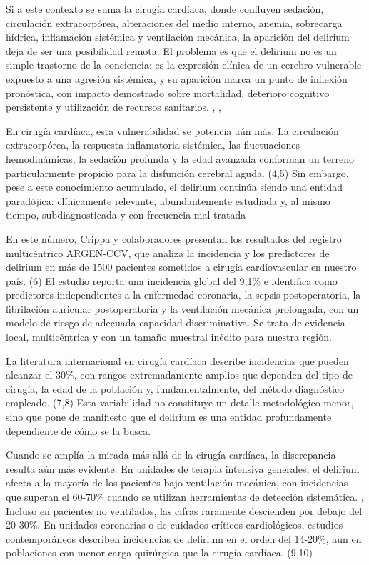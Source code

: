 Si a este contexto se suma la cirugía cardíaca, donde confluyen sedación, circulación extracorpórea, alteraciones del medio interno, anemia, sobrecarga hídrica, inflamación sistémica y ventilación mecánica, la aparición del delirium deja de ser una posibilidad remota. El problema es que el delirium no es un simple trastorno de la conciencia: es la expresión clínica de un cerebro vulnerable expuesto a una agresión sistémica, y su aparición marca un punto de inflexión pronóstica, con impacto demostrado sobre mortalidad, deterioro cognitivo persistente y utilización de recursos sanitarios. \cite{1262-ELY2004}, \cite{1298-INOUYE2014}, \cite{1299-WILSON2020}

En cirugía cardíaca, esta vulnerabilidad se potencia aún más. La circulación extracorpórea, la respuesta inflamatoria sistémica, las fluctuaciones hemodinámicas, la sedación profunda y la edad avanzada conforman un terreno particularmente propicio para la disfunción cerebral aguda. (4,5) Sin embargo, pese a este conocimiento acumulado, el delirium continúa siendo una entidad paradójica: clínicamente relevante, abundantemente estudiada y, al mismo tiempo, subdiagnosticada y con frecuencia mal tratada

En este número, Crippa y colaboradores presentan los resultados del registro multicéntrico ARGEN-CCV, que analiza la incidencia y los predictores de delirium en más de 1500 pacientes sometidos a cirugía cardiovascular en nuestro país. (6) El estudio reporta una incidencia global del 9,1\% e identifica como predictores independientes a la enfermedad coronaria, la sepsis postoperatoria, la fibrilación auricular postoperatoria y la ventilación mecánica prolongada, con un modelo de riesgo de adecuada capacidad discriminativa. Se trata de evidencia local, multicéntrica y con un tamaño muestral inédito para nuestra región.

La literatura internacional en cirugía cardíaca describe incidencias que pueden alcanzar el 30\%, con rangos extremadamente amplios que dependen del tipo de cirugía, la edad de la población y, fundamentalmente, del método diagnóstico empleado. (7,8) Esta variabilidad no constituye un detalle metodológico menor, sino que pone de manifiesto que el delirium es una entidad profundamente dependiente de cómo se la busca.

Cuando se amplía la mirada más allá de la cirugía cardíaca, la discrepancia resulta aún más evidente. En unidades de terapia intensiva generales, el delirium afecta a la mayoría de los pacientes bajo ventilación mecánica, con incidencias que superan el 60-70\% cuando se utilizan herramientas de detección sistemática. \cite{1262-ELY2004}, \cite{1298-INOUYE2014} Incluso en pacientes no ventilados, las cifras raramente descienden por debajo del 20-30\%. En unidades coronarias o de cuidados críticos cardiológicos, estudios contemporáneos describen incidencias de delirium en el orden del 14-20\%, aun en poblaciones con menor carga quirúrgica que la cirugía cardíaca. (9,10)

